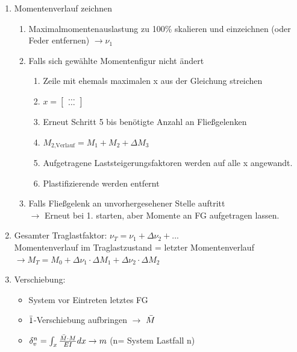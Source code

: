 \documentclass[fleqn,twoside]{article}
\begin{document}
\begin{enumerate}
            \item Momentenverlauf zeichnen
                \begin{enumerate}
                    \item Maximalmomentenauslastung zu 100\% skalieren und einzeichnen (oder Feder entfernen) $\rightarrow \nu_1$
                    \item Falls sich gewählte Momentenfigur nicht ändert 
                        \begin{enumerate}
                            \item Zeile mit ehemals maximalen x aus der Gleichung streichen
                            \item $ x= \begin{bmatrix} \ldots \\ \ldots \end{bmatrix}$
                            \item Erneut Schritt 5 bis benötigte Anzahl an Fließgelenken
                            \item $M_{\text{2,Verlauf}} = M_1 + M_2 + \Delta M_3$
                            \item Aufgetragene Laststeigerungsfaktoren werden auf alle x angewandt. 
                            \item Plastifizierende werden entfernt
                        \end{enumerate}
                    \item Falls Fließgelenk an unvorhergesehener Stelle auftritt \\ $\rightarrow$ Erneut bei 1. starten, aber Momente an FG aufgetragen lassen.
                \end{enumerate}
            \item Gesamter Traglastfaktor: $\nu_T = \nu_1 + \Delta \nu_2 + ...$ \\
                Momentenverlauf im Traglastzustand = letzter Momentenverlauf \\
                $\rightarrow M_T = M_0 + \Delta \nu_1 \cdot \Delta M_1 + \Delta \nu_2 \cdot \Delta M_2$
            \item Verschiebung:
                \begin{itemize}
                    \item System vor Eintreten letztes FG
                    \item $\Bar{1}$-Verschiebung aufbringen $\rightarrow$ $\Bar{M}$
                    \item $\delta_v^n = \int_x \frac{\Bar{M} \cdot M}{EI} dx \rightarrow m$ (n= System Lastfall n)
                \end{itemize}
        \end{enumerate}
\end{document}
